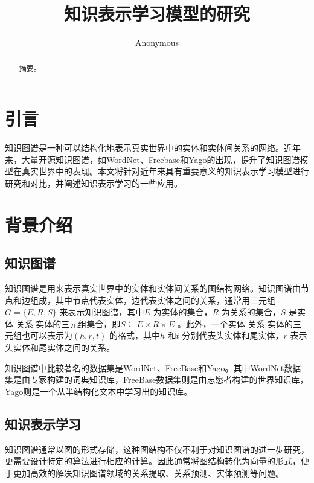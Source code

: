 \documentclass{llncs}
\begin{document}
	
\title{知识表示学习模型的研究}
\author{Anonymous}
\maketitle

\begin{abstract}

摘要。


\end{abstract}

\section{引言}

知识图谱是一种可以结构化地表示真实世界中的实体和实体间关系的网络。近年来，大量开源知识图谱，如WordNet\cite{Miller:1995:WLD:219717.219748}、Freebase\cite{Bollacker:2008:FCC:1376616.1376746}和Yago\cite{suchanek2007yago}的出现，提升了知识图谱模型在真实世界中的表现。本文将针对近年来具有重要意义的知识表示学习模型进行研究和对比，并阐述知识表示学习的一些应用。

\section{背景介绍}

\subsection{知识图谱}

知识图谱是用来表示真实世界中的实体和实体间关系的图结构网络。知识图谱由节点和边组成，其中节点代表实体，边代表实体之间的关系，通常用三元组$G=\{E,R,S\}$ 来表示知识图谱，其中$E$ 为实体的集合，$R$ 为关系的集合，$S$ 是实体-关系-实体的三元组集合，即$S\subseteq{E×R×E}$ 。此外，一个实体-关系-实体的三元组也可以表示为$(h,r,t)$ 的格式，其中$h$ 和$t$ 分别代表头实体和尾实体，$r$ 表示头实体和尾实体之间的关系。

知识图谱中比较著名的数据集是WordNet、FreeBase和Yago。其中WordNet数据集是由专家构建的词典知识库，FreeBase数据集则是由志愿者构建的世界知识库，Yago则是一个从半结构化文本中学习出的知识库。

\subsection{知识表示学习}

知识图谱通常以图的形式存储，这种图结构不仅不利于对知识图谱的进一步研究，更需要设计特定的算法进行相应的计算。因此通常将图结构转化为向量的形式，便于更加高效的解决知识图谱领域的关系提取、关系预测、实体预测等问题。
\end{document}
